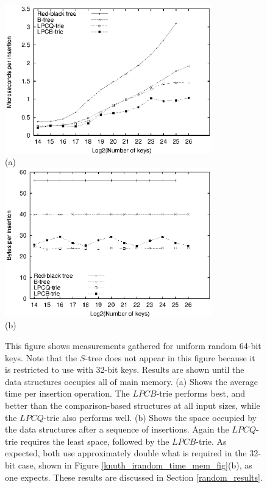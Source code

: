 \documentclass[]{acmtrans2m}
\begin{document}
\begin{figure}
\center
\includegraphics[width=0.8\textwidth]{plots/athena_irandom_time.eps}\\
(a)\\
\includegraphics[width=0.8\textwidth]{plots/athena_irandom_mem.eps}\\
(b)\\
\caption{This figure shows measurements gathered for uniform random 64-bit keys. Note
that the $S$-tree does not appear in this figure because it is restricted to use with
32-bit keys. Results are shown until the data structures occupies all of main memory. 
(a) Shows the average time per insertion operation. The $LPCB$-trie performs best, and better than the comparison-based
structures at all input sizes, while the $LPCQ$-trie also performs well. (b) Shows the space occupied by the data structures after a sequence
of insertions. Again the $LPCQ$-trie requires the least space, followed by the $LPCB$-trie. As expected, both use approximately double what is
required in the 32-bit case, shown in Figure \ref{knuth_irandom_time_mem_fig}(b), as one expects. 
These results are discussed in Section \ref{random_results}.}
\label{athena_irandom_time_mem_fig}
\end{figure}
\end{document}
